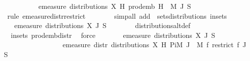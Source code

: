 \begin{isabellebody}
\ \ \ \ \ \ \ \ \ \ emeasure\ {\isacharparenleft}{\kern0pt}distributions\ X\ H{\isacharparenright}{\kern0pt}\ {\isacharparenleft}{\kern0pt}prod{\isacharunderscore}{\kern0pt}emb\ H\ {\isacharparenleft}{\kern0pt}{\isasymlambda}{\isacharunderscore}{\kern0pt}{\isachardot}{\kern0pt}\ {\isacharquery}{\kern0pt}M{\isacharprime}{\kern0pt}{\isacharparenright}{\kern0pt}\ J\ S{\isacharparenright}{\kern0pt}{\isachardoublequoteclose}\isanewline
\ \ \ \ \ \ \isamarkupfalse%
\ {\isacharparenleft}{\kern0pt}rule\ emeasure{\isacharunderscore}{\kern0pt}distr{\isacharunderscore}{\kern0pt}restrict{\isacharparenright}{\kern0pt}\isanewline
\ \ \ \ \ \ \isamarkupfalse%
\ {\isacharparenleft}{\kern0pt}simp{\isacharunderscore}{\kern0pt}all\ add{\isacharcolon}{\kern0pt}\ {\isachardoublequoteopen}{\isacharasterisk}{\kern0pt}{\isachardoublequoteclose}\ sets{\isacharunderscore}{\kern0pt}distributions\ in{\isacharunderscore}{\kern0pt}sets{\isacharparenright}{\kern0pt}\isanewline
\ \ \ \ \isamarkupfalse%
\ \isamarkupfalse%
\ {\isachardoublequoteopen}{\isachardot}{\kern0pt}{\isachardot}{\kern0pt}{\isachardot}{\kern0pt}\ {\isacharequal}{\kern0pt}\ emeasure\ {\isacharparenleft}{\kern0pt}distributions\ X\ J{\isacharparenright}{\kern0pt}\ S{\isachardoublequoteclose}\isanewline
\ \ \ \ \ \ \isamarkupfalse%
\ distributions{\isacharunderscore}{\kern0pt}altdef\isanewline
\ \ \ \ \ \ \ \ \isamarkupfalse%
\ {\isacharasterisk}{\kern0pt}{\isacharparenleft}{\kern0pt}{}{\isacharcomma}{\kern0pt}{}{\isacharparenright}{\kern0pt}\ in{\isacharunderscore}{\kern0pt}sets\ prod{\isacharunderscore}{\kern0pt}emb{\isacharunderscore}{\kern0pt}distr\ \isamarkupfalse%
\ force\isanewline
\ \ \ \ \isamarkupfalse%
\ \isamarkupfalse%
\ {\isachardoublequoteopen}emeasure\ {\isacharparenleft}{\kern0pt}distributions\ X\ J{\isacharparenright}{\kern0pt}\ S\ \isanewline
\ \ \ \ \ \ \ \ \ \ \ \ \ \ \ \ {\isacharequal}{\kern0pt}\ emeasure\ {\isacharparenleft}{\kern0pt}distr\ {\isacharparenleft}{\kern0pt}distributions\ X\ H{\isacharparenright}{\kern0pt}\ {\isacharparenleft}{\kern0pt}Pi\isactrlsub M\ J\ {\isacharparenleft}{\kern0pt}{\isasymlambda}{\isacharunderscore}{\kern0pt}{\isachardot}{\kern0pt}\ {\isacharquery}{\kern0pt}M{\isacharprime}{\kern0pt}{\isacharparenright}{\kern0pt}{\isacharparenright}{\kern0pt}\ {\isacharparenleft}{\kern0pt}{\isasymlambda}f{\isachardot}{\kern0pt}\ restrict\ f\ J{\isacharparenright}{\kern0pt}{\isacharparenright}{\kern0pt}\ S{\isachardoublequoteclose}\isanewline

\end{isabellebody}
